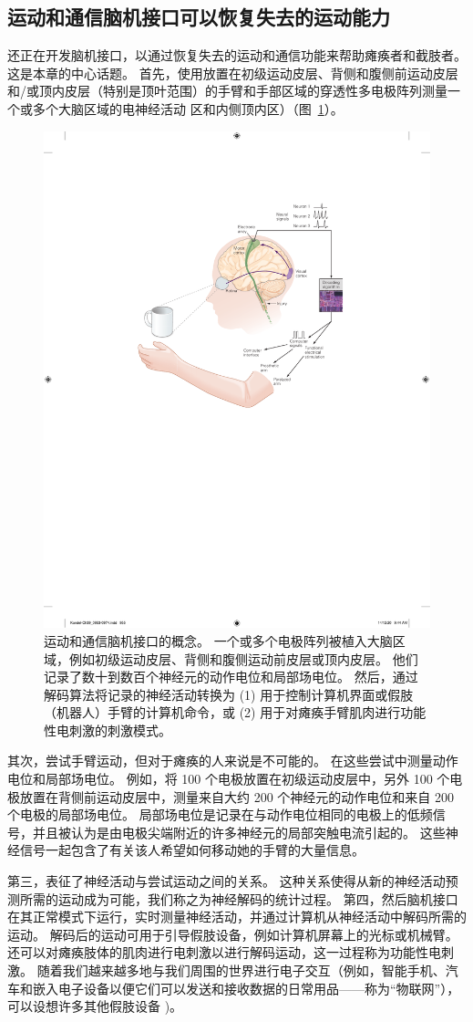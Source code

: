 \subsection{运动和通信脑机接口可以恢复失去的运动能力}

还正在开发脑机接口，以通过恢复失去的运动和通信功能来帮助瘫痪者和截肢者。
这是本章的中心话题。
首先，使用放置在初级运动皮层、背侧和腹侧前运动皮层和/或顶内皮层（特别是顶叶范围）的手臂和手部区域的穿透性多电极阵列测量一个或多个大脑区域的电神经活动 区和内侧顶内区）（图~\ref{fig:39_1}）。


\begin{figure}[htbp]
	\centering
	\includegraphics[width=0.5\linewidth]{chap39/fig_39_1}
	\caption{运动和通信脑机接口的概念。
		一个或多个电极阵列被植入大脑区域，例如初级运动皮层、背侧和腹侧运动前皮层或顶内皮层。
		他们记录了数十到数百个神经元的动作电位和局部场电位。
		然后，通过解码算法将记录的神经活动转换为 (1) 用于控制计算机界面或假肢（机器人）手臂的计算机命令，或 (2) 用于对瘫痪手臂肌肉进行功能性电刺激的刺激模式。}
	\label{fig:39_1}
\end{figure}


其次，尝试手臂运动，但对于瘫痪的人来说是不可能的。 
在这些尝试中测量动作电位和局部场电位。
例如，将 100 个电极放置在初级运动皮层中，另外 100 个电极放置在背侧前运动皮层中，测量来自大约 200 个神经元的动作电位和来自 200 个电极的局部场电位。
局部场电位是记录在与动作电位相同的电极上的低频信号，并且被认为是由电极尖端附近的许多神经元的局部突触电流引起的。
这些神经信号一起包含了有关该人希望如何移动她的手臂的大量信息。


第三，表征了神经活动与尝试运动之间的关系。
这种关系使得从新的神经活动预测所需的运动成为可能，我们称之为神经解码的统计过程。
第四，然后脑机接口在其正常模式下运行，实时测量神经活动，并通过计算机从神经活动中解码所需的运动。
解码后的运动可用于引导假肢设备，例如计算机屏幕上的光标或机械臂。
还可以对瘫痪肢体的肌肉进行电刺激以进行解码运动，这一过程称为功能性电刺激。
随着我们越来越多地与我们周围的世界进行电子交互（例如，智能手机、汽车和嵌入电子设备以便它们可以发送和接收数据的日常用品——称为“物联网”），可以设想许多其他假肢设备 )。


